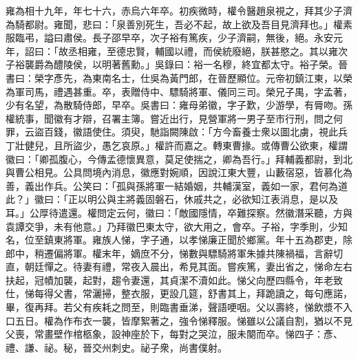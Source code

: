 \begin{pinyinscope}
雍為相十九年，年七十六，赤烏六年卒。初疾微時，權令醫趙泉視之，拜其少子濟為騎都尉。雍聞，悲曰：「泉善別死生，吾必不起，故上欲及吾目見濟拜也。」權素服臨弔，謚曰肅侯。長子邵早卒，次子裕有篤疾，少子濟嗣，無後，絕。永安元年，詔曰：「故丞相雍，至德忠賢，輔國以禮，而侯統廢絕，朕甚愍之。其以雍次子裕襲爵為醴陵侯，以明著舊勳。」吳錄曰：裕一名穆，終宜都太守。裕子榮。晉書曰：榮字彥先，為東南名士，仕吳為黃門郎，在晉歷顯位。元帝初鎮江東，以榮為軍司馬，禮遇甚重。卒，表贈侍中、驃騎將軍、儀同三司。榮兄子禺，字孟著，少有名望，為散騎侍郎，早卒。吳書曰：雍母弟徽，字子歎，少游學，有脣吻。孫權統事，聞徽有才辯，召署主簿。嘗近出行，見營軍將一男子至巿行刑，問之何罪，云盜百錢，徽語使住。須臾，馳詣闕陳啟：「方今畜養士衆以圖北虜，視此兵丁壯健兒，且所盜少，愚乞哀原。」權許而嘉之。轉東曹掾。或傳曹公欲東，權謂徽曰：「卿孤腹心，今傳孟德懷異意，莫足使揣之，卿為吾行。」拜輔義都尉，到北與曹公相見。公具問境內消息，徽應對婉順，因說江東大豐，山藪宿惡，皆慕化為善，義出作兵。公笑曰：「孤與孫將軍一結婚姻，共輔漢室，義如一家，君何為道此？」徽曰：「正以明公與主將義固磐石，休戚共之，必欲知江表消息，是以及耳。」公厚待遣還。權問定云何，徽曰：「敵國隱情，卒難探察。然徽潛采聽，方與袁譚交爭，未有他意。」乃拜徽巴東太守，欲大用之，會卒。子裕，字季則，少知名，位至鎮東將軍。雍族人悌，字子通，以孝悌廉正聞於鄉黨。年十五為郡吏，除郎中，稍遷偏將軍。權末年，嫡庶不分，悌數與驃騎將軍朱據共陳禍福，言辭切直，朝廷憚之。待妻有禮，常夜入晨出，希見其面。嘗疾篤，妻出省之，悌命左右扶起，冠幘加襲，起對，趨令妻還，其貞潔不瀆如此。悌父向歷四縣令，年老致仕，悌每得父書，常灑掃，整衣服，更設几筵，舒書其上，拜跪讀之，每句應諾，畢，復再拜。若父有疾耗之問至，則臨書垂涕，聲語哽咽。父以壽終，悌飲漿不入口五日。權為作布衣一襲，皆摩絮著之，強令悌釋服。悌雖以公議自割，猶以不見父喪，常畫壁作棺柩象，設神座於下，每對之哭泣，服未闋而卒。悌四子：彥、禮、謙、祕。秘，晉交州刺史。祕子衆，尚書僕射。


\end{pinyinscope}